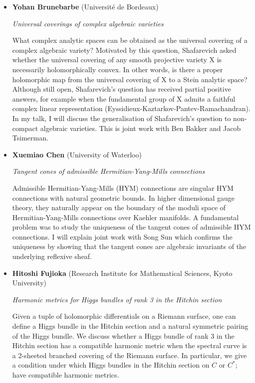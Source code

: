\documentclass{article}
\begin{document}
\begin{itemize}
\item {\bf Yohan Brunebarbe} (Universit\'e de Bordeaux)

{\it Universal coverings of complex algebraic varieties}

What complex analytic spaces can be obtained as the universal covering of a complex algebraic variety? Motivated by this question, Shafarevich asked whether the universal covering of any smooth projective variety X is necessarily holomorphically convex. In other words, is there a proper holomorphic map from the universal covering of X to a Stein analytic space? Although still open, Shafarevich's question has received partial positive answers, for example when the fundamental group of X admits a faithful complex linear representation (Eyssidieux-Kaztarkov-Pantev-Ramachandran). In my talk, I will discuss the generalisation of Shafarevich's question to non-compact algebraic varieties. This is joint work with Ben Bakker and Jacob Tsimerman.


\item {\bf Xuemiao Chen} (University of Waterloo) 

{\it Tangent cones of admissible Hermitian-Yang-Mills connections }

Admissible Hermitian-Yang-Mills (HYM) connections are singular HYM connections with natural geometric bounds. In higher dimensional gauge theory, they naturally appear on the boundary of the moduli space of Hermitian-Yang-Mills connections over Kaehler manifolds. A fundamental problem was to study the uniqueness of the tangent cones of admissible HYM connections. I will explain joint work with Song Sun which confirms the uniqueness by showing that the tangent cones are algebraic invariants of the underlying reflexive sheaf.

\item {\bf Hitoshi Fujioka} (Research Institute for Mathematical Sciences, Kyoto University)

{\it Harmonic metrics for Higgs bundles of rank 3 in the Hitchin section}

Given a tuple of holomorphic differentials on a Riemann surface, one can
define a Higgs bundle in the Hitchin section and a natural symmetric
pairing of the Higgs bundle. We discuss whether a Higgs bundle of rank 3
in the Hitchin section has a compatible harmonic metric when the spectral
curve is a 2-sheeted branched covering of the Riemann surface. In
particular, we give a condition under which Higgs bundles in the Hitchin
section on $C$ or $C^\ast$; have compatible harmonic metrics.



\end{itemize}
\end{document}
